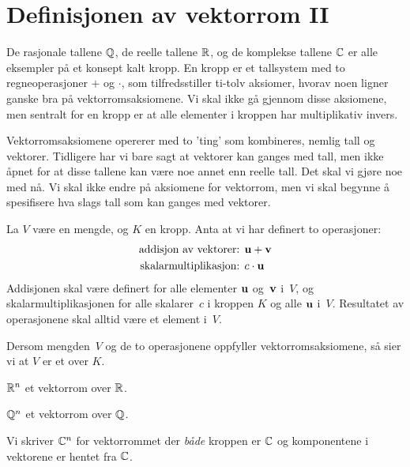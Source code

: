 

\label{ch:kompleks-linear-algebra}

\section*{Definisjonen av vektorrom II}

De rasjonale tallene $\mathbb{Q}$, de reelle tallene $\mathbb{R}$, og de komplekse tallene $\mathbb{C}$ er alle eksempler på et konsept kalt kropp. En kropp er et tallsystem med to regneoperasjoner $+$ og $\cdot$, som tilfredsstiller ti-tolv aksiomer, hvorav noen ligner ganske bra på vektorromsaksiomene. Vi skal ikke gå gjennom disse aksiomene, men sentralt for en kropp er at alle elementer i kroppen har multiplikativ invers.

Vektorromsaksiomene opererer med to 'ting' som kombineres, nemlig tall og vektorer. Tidligere har vi bare sagt at vektorer kan ganges med tall, men ikke åpnet for at disse tallene kan være noe annet enn reelle tall. Det skal vi gjøre noe med nå. Vi skal ikke endre på aksiomene for vektorrom, men vi skal begynne å spesifisere hva slags tall som kan ganges med vektorer. 

\begin{defn}
La $V$ være en mengde, og $K$ en kropp. Anta at vi har definert to operasjoner:
\begin{align*}
\text{addisjon av vektorer: } & \mathbf{u} + \mathbf{v} \\
\text{skalarmultiplikasjon: } & c \cdot \mathbf{u}
\end{align*}
Addisjonen skal være definert for alle elementer $\mathbf{u}$ og~$\mathbf{v}$
i~$V$, og skalarmultiplikasjonen for alle skalarer~$c$ i kroppen $K$ og alle $\mathbf{u}$
i~$V$.  Resultatet av operasjonene skal alltid være et element i~$V$.

Dersom mengden~$V$ og de to operasjonene oppfyller vektorromsaksiomene, 
så sier vi at $V$ er et  over $K$.
\end{defn}

\begin{ex}
$\mathbb{R}^n$ et vektorrom over $\mathbb{R}$.
\end{ex}
\begin{ex}
$\mathbb{Q}^n$ et vektorrom over $\mathbb{Q}$.
\end{ex}
\begin{ex}
Vi skriver $\mathbb{C}^n$ for vektorrommet der \emph{både} kroppen er $\mathbb{C}$ og komponentene i vektorene er hentet fra $\mathbb{C}$.
\end{ex}

